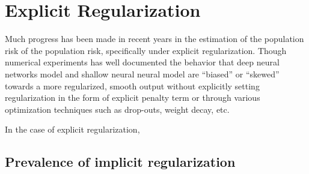 \chapter{Explicit Regularization}

Much progress has been made in recent years in the estimation of the population risk of the population risk, specifically under explicit regularization.
Though numerical experiments has well documented \TOCITE the behavior that deep neural networks model and shallow neural neural model are ``biased'' or ``skewed'' towards 
a more regularized, smooth output without explicitly setting regularization in the form of explicit penalty term or through various 
optimization techniques such as drop-outs, weight decay, etc.

In the case of explicit regularization, 

\section{Prevalence of implicit regularization}



